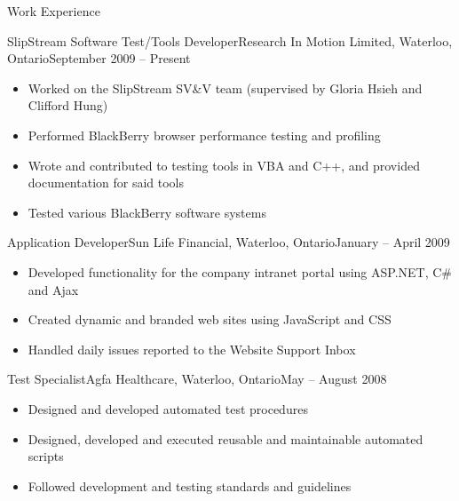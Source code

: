 \documentclass[11pt]{article}
\begin{document}
	\begin{section}{Work Experience} \\
	
		\begin{subsection}{SlipStream Software Test/Tools Developer}{Research In Motion Limited, Waterloo, Ontario}{September 2009 -- Present}
		
			\begin{itemize}
				\item Worked on the SlipStream SV\&V team (supervised by Gloria Hsieh and Clifford Hung)
				\item Performed BlackBerry browser performance testing and profiling
				\item Wrote and contributed to testing tools in VBA and C++, and provided documentation for said tools
				\item Tested various BlackBerry software systems 
			\end{itemize}
			
		\end{subsection}
			
		\begin{subsection}{Application Developer}{Sun Life Financial, Waterloo, Ontario}{January -- April 2009}
		
			\begin{itemize}
				\item Developed functionality for the company intranet portal using ASP.NET, C\# and Ajax
				\item Created dynamic and branded web sites using JavaScript and CSS
				\item Handled daily issues reported to the Website Support Inbox
			\end{itemize}
			
		\end{subsection}
			
		\begin{subsection}{Test Specialist}{Agfa Healthcare, Waterloo, Ontario}{May -- August 2008}
		
			\begin{itemize}
				\item Designed and developed automated test procedures
				\item Designed, developed and executed reusable and maintainable automated scripts
				\item Followed development and testing standards and guidelines
			\end{itemize}
			
		\end{subsection}
			
	\end{section}
	
\end{document}
